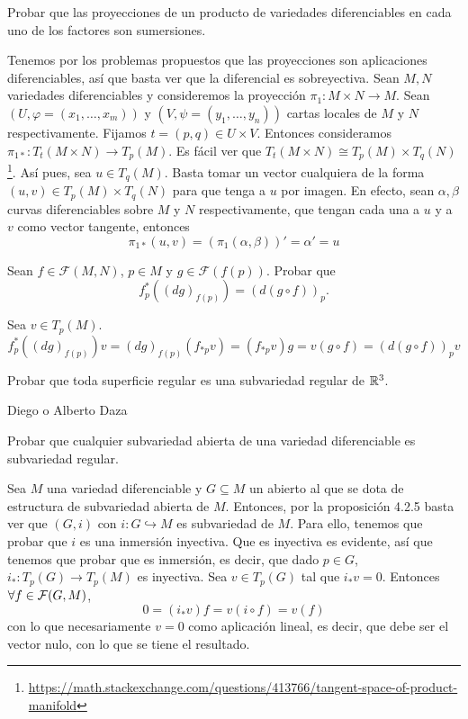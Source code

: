 \documentclass[twoside]{article}
\newcounter{ejercicio}
\begin{document}
\newpage
\begin{ejercicio}{4}
Probar que las proyecciones de un producto de variedades diferenciables en
cada uno de los factores son sumersiones.
\end{ejercicio}
\begin{solucion}
Tenemos por los problemas propuestos que las proyecciones son aplicaciones diferenciables, así que basta ver que la diferencial es sobreyectiva. Sean $M,N$ variedades diferenciables y consideremos la proyección $\pi_1:M\times N\to M$. Sean $(U,\varphi=(x_1,\dots, x_m))$ y $(V,\psi=(y_1,\dots,y_n))$ cartas locales de $M$ y $N$ respectivamente. Fijamos $t=(p,q)\in U\times V$. Entonces consideramos $\pi_{1*}:T_t(M\times N)\to T_p(M)$. Es fácil ver que $T_t(M\times N)\cong T_p(M)\times T_q(N)$\footnote{\url{https://math.stackexchange.com/questions/413766/tangent-space-of-product-manifold}}. Así pues, sea $u\in T_q(M)$. Basta tomar un vector cualquiera de la forma $(u,v)\in T_p(M)\times T_q(N)$ para que tenga a $u$ por imagen. En efecto, sean $\alpha,\beta
$ curvas diferenciables sobre $M$ y $N$ respectivamente, que tengan cada una a $u$ y a $v$ como vector tangente, entonces
$$\pi_{1*}(u,v)=(\pi_1(\alpha,\beta))'=\alpha'=u$$
\end{solucion}

\newpage

\begin{ejercicio}{5}\label{1}
Sean $f\in\mathcal{F}(M,N)$, $p\in M$ y $g\in\mathcal{F}(f(p))$. Probar que $$f^*_p((dg)_{f(p)})=(d(g\circ f))_p.$$
\end{ejercicio}
\begin{solucion}
Sea $v\in T_p(M)$. 
$$f^*_p((dg)_{f(p)})v=(dg)_{f(p)}(f_{*p}v)=(f_{*p}v)g=v(g\circ f)=(d(g\circ f))_pv$$
\end{solucion}

\newpage

\begin{ejercicio}{6}
Probar que toda superficie regular es una subvariedad regular de $\mathbb{R}^3$.
\end{ejercicio}
\begin{solucion}
Diego o Alberto Daza
\end{solucion}

\newpage

\begin{ejercicio}{7}
Probar que cualquier subvariedad abierta de una variedad diferenciable es
subvariedad regular.
\end{ejercicio}
\begin{solucion}
Sea $M$ una variedad diferenciable y $G\subseteq M$ un abierto al que se dota de estructura de subvariedad abierta de $M$. Entonces, por la proposición 4.2.5 basta ver que $(G,i)$ con $i:G\hookrightarrow M$ es subvariedad de $M$. Para ello, tenemos que probar que $i$ es una inmersión inyectiva. Que es inyectiva es evidente, así que tenemos que probar que es inmersión, es decir, que dado $p\in G$, $i_*:T_p(G)\to T_p(M)$ es inyectiva. Sea $v\in T_p(G)$ tal que $i_*v=0$. Entonces $\forall f\in\mathcal{F}(G,M)$, 
$$0=(i_*v)f =v(i\circ f)=v(f)$$
con lo que necesariamente $v=0$ como aplicación lineal, es decir, que debe ser el vector nulo, con lo que se tiene el resultado.
\end{solucion}
\end{document}
